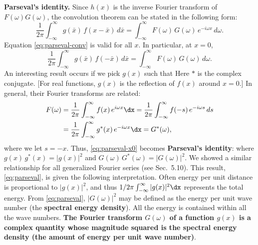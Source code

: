 \textbf{Parseval's identity.}  Since $h(x)$ is the inverse Fourier transform of $F(\omega)G(\omega)$, the convolution theorem can be stated in the following form:
\begin{equation}
\label{eq:parseval-conv}
\frac{1}{2\pi}\int_{-\infty}^{\infty}g(\bar{x})\,f(x-\bar{x})\,d\bar{x} = \int_{-\infty}^{\infty}F(\omega)\,G(\omega)\,e^{-i\omega x}\,d\omega.
\end{equation}
Equation \eqref{eq:parseval-conv} is valid for all $x$.  In particular, at $x = 0$,
\begin{equation}
\label{eq:parseval-x0}
\frac{1}{2\pi}\int_{-\infty}^{\infty}g(\bar{x})\,f(-\bar{x})\,d\bar{x} = \int_{-\infty}^{\infty}F(\omega)\,G(\omega)\,d\omega.
\end{equation}
An interesting result occurs if we pick $g(x)$ such that
Here $*$ is the complex conjugate.  [For real functions, $g(x)$ is the reflection of $f(x)$ around $x = 0$.]  In general, their Fourier transforms are related:
\begin{equation}
\label{eq:ft-star-relation}
\begin{aligned}
F(\omega) &= \frac{1}{2\pi}\int_{-\infty}^{\infty}f(x)\,e^{i\omega x}\dx = \frac{1}{2\pi}\int_{-\infty}^{\infty}f(-s)\,e^{-i\omega s}\,ds \\
&= \frac{1}{2\pi}\int_{-\infty}^{\infty}g^*(x)\,e^{-i\omega x}\dx = G^*(\omega),
\end{aligned}
\end{equation}
where we let $s = -x$.  Thus, \eqref{eq:parseval-x0} becomes \textbf{Parseval's identity}:
where $g(x)\,g^*(x) = |g(x)|^2$ and $G(\omega)\,G^*(\omega) = |G(\omega)|^2$.  We showed a similar relationship for all generalized Fourier series (see Sec.~5.10).  This result, \eqref{eq:parseval}, is given the following interpretation.  Often energy per unit distance is proportional to $|g(x)|^2$, and thus $1/2\pi\int_{-\infty}^{\infty}|g(x)|^2\dx$ represents the total energy.  From \eqref{eq:parseval}, $|G(\omega)|^2$ may be defined as the energy per unit wave number (the \textbf{spectral energy density}).  All the energy is contained within all the wave numbers.  \textbf{The Fourier transform $G(\omega)$ of a function $g(x)$ is a complex quantity whose magnitude squared is the spectral energy density (the amount of energy per unit wave number)}.

